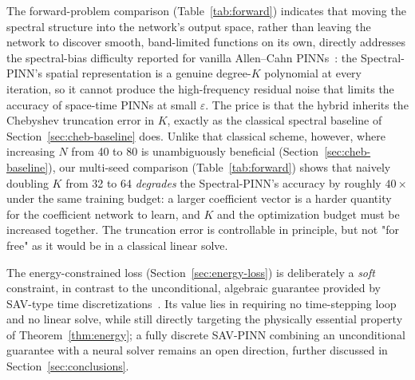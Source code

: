 \documentclass[symmetry,article,submit,moreauthors]{Definitions/mdpi}
\begin{document}
The forward-problem comparison (Table~\ref{tab:forward}) indicates that moving the spectral structure into the network's output space, rather than leaving the network to discover smooth, band-limited functions on its own, directly addresses the spectral-bias difficulty reported for vanilla Allen--Cahn PINNs~\cite{Wight}: the Spectral-PINN's spatial representation is a genuine degree-$K$ polynomial at every iteration, so it cannot produce the high-frequency residual noise that limits the accuracy of space-time PINNs at small $\varepsilon$. The price is that the hybrid inherits the Chebyshev truncation error in $K$, exactly as the classical spectral baseline of Section~\ref{sec:cheb-baseline} does. Unlike that classical scheme, however, where increasing $N$ from 40 to 80 is unambiguously beneficial (Section~\ref{sec:cheb-baseline}), our multi-seed comparison (Table~\ref{tab:forward}) shows that naively doubling $K$ from 32 to 64 \emph{degrades} the Spectral-PINN's accuracy by roughly $40\times$ under the same training budget: a larger coefficient vector is a harder quantity for the coefficient network to learn, and $K$ and the optimization budget must be increased together. The truncation error is controllable in principle, but not "for free" as it would be in a classical linear solve.

The energy-constrained loss (Section~\ref{sec:energy-loss}) is deliberately a \emph{soft} constraint, in contrast to the unconditional, algebraic guarantee provided by SAV-type time discretizations~\cite{Shen_SAV,Huang_GSAV,Jiang_RSAV}. Its value lies in requiring no time-stepping loop and no linear solve, while still directly targeting the physically essential property of Theorem~\ref{thm:energy}; a fully discrete SAV-PINN combining an unconditional guarantee with a neural solver remains an open direction, further discussed in Section~\ref{sec:conclusions}.
\end{document}
